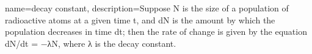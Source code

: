 {
    name=decay constant,
    description={Suppose N is the size of a population of radioactive atoms at a given time t, and dN is the amount by which the population decreases in time dt; then the rate of change is given by the equation dN/dt = −λN, where λ is the decay constant.}
}
